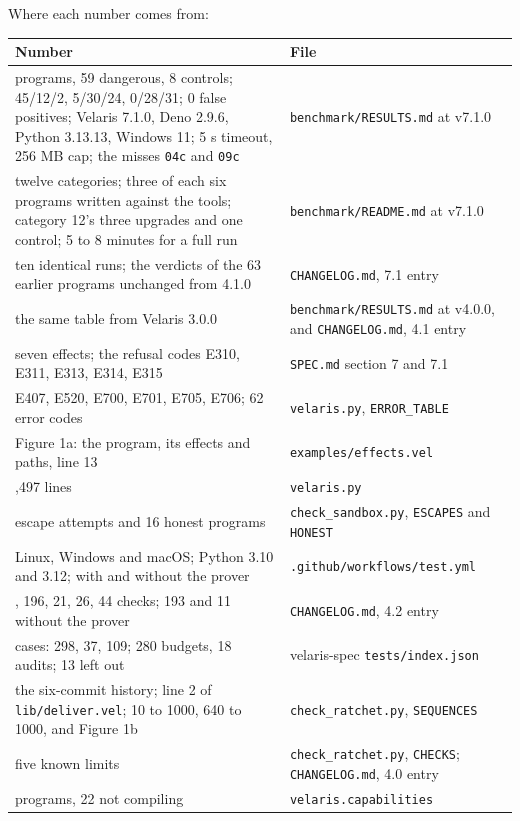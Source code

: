 \documentclass[
]{article}
\newcounter{none} %
\begin{document}
Where each number comes from:

{\def\LTcaptype{none} %
\begin{longtable}[]{@{}
  >{\raggedright\arraybackslash}p{}
  >{\raggedright\arraybackslash}p{}@{}}
\toprule\noalign{}
\begin{minipage}[b]{\linewidth}\raggedright
Number
\end{minipage} & \begin{minipage}[b]{\linewidth}\raggedright
File
\end{minipage} \\
\midrule\noalign{}
\endhead
\bottomrule\noalign{}
\endlastfoot
67 programs, 59 dangerous, 8 controls; 45/12/2, 5/30/24, 0/28/31; 0
false positives; Velaris 7.1.0, Deno 2.9.6, Python 3.13.13, Windows 11;
5 s timeout, 256 MB cap; the misses \texttt{04c} and \texttt{09c} &
\texttt{benchmark/RESULTS.md} at v7.1.0 \\
twelve categories; three of each six programs written against the tools;
category 12's three upgrades and one control; 5 to 8 minutes for a full
run & \texttt{benchmark/README.md} at v7.1.0 \\
ten identical runs; the verdicts of the 63 earlier programs unchanged
from 4.1.0 & \texttt{CHANGELOG.md}, 7.1 entry \\
the same table from Velaris 3.0.0 & \texttt{benchmark/RESULTS.md} at
v4.0.0, and \texttt{CHANGELOG.md}, 4.1 entry \\
seven effects; the refusal codes E310, E311, E313, E314, E315 &
\texttt{SPEC.md} section 7 and 7.1 \\
E407, E520, E700, E701, E705, E706; 62 error codes &
\texttt{velaris.py}, \texttt{ERROR\_TABLE} \\
Figure 1a: the program, its effects and paths, line 13 &
\texttt{examples/effects.vel} \\
13,497 lines & \texttt{velaris.py} \\
34 escape attempts and 16 honest programs & \texttt{check\_sandbox.py},
\texttt{ESCAPES} and \texttt{HONEST} \\
Linux, Windows and macOS; Python 3.10 and 3.12; with and without the
prover & \texttt{.github/workflows/test.yml} \\
114, 196, 21, 26, 44 checks; 193 and 11 without the prover &
\texttt{CHANGELOG.md}, 4.2 entry \\
444 cases: 298, 37, 109; 280 budgets, 18 audits; 13 left out &
velaris-spec \texttt{tests/index.json} \\
the six-commit history; line 2 of \texttt{lib/deliver.vel}; 10 to 1000,
640 to 1000, and Figure 1b & \texttt{check\_ratchet.py},
\texttt{SEQUENCES} \\
five known limits & \texttt{check\_ratchet.py}, \texttt{CHECKS};
\texttt{CHANGELOG.md}, 4.0 entry \\
172 programs, 22 not compiling & \texttt{velaris.capabilities} \\
\end{longtable}
}

\renewcommand\refname{References}

\end{document}
